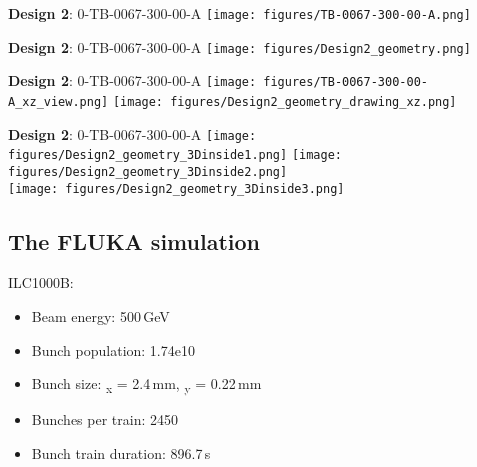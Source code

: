 \documentclass[xcolor={dvipsnames}]{beamer}
\begin{document}
\begin{frame}{\textbf{Design 2}: 0-TB-0067-300-00-A}
\centering
  \texttt{[image: figures/TB-0067-300-00-A.png]}
\end{frame}
\begin{frame}{\textbf{Design 2}: 0-TB-0067-300-00-A}
\centering
  \texttt{[image: figures/Design2\_geometry.png]}
\end{frame}
\begin{frame}{\textbf{Design 2}: 0-TB-0067-300-00-A}
\centering
  \texttt{[image: figures/TB-0067-300-00-A\_xz\_view.png]}
  \hfill
  \texttt{[image: figures/Design2\_geometry\_drawing\_xz.png]}
\end{frame}
\begin{frame}{\textbf{Design 2}: 0-TB-0067-300-00-A}
\centering
  \texttt{[image: figures/Design2\_geometry\_3Dinside1.png]}
    \texttt{[image: figures/Design2\_geometry\_3Dinside2.png]}\\
      \texttt{[image: figures/Design2\_geometry\_3Dinside3.png]}
\end{frame}



\subsection{The FLUKA simulation}
\begin{frame}
 ILC1000B:
 \begin{itemize}
  \item Beam energy: 500\,GeV
  \item Bunch population: 1.74e10
  \item Bunch size: \textsigma\textsubscript{x} = 2.4\,mm, \textsigma\textsubscript{y} = 0.22\,mm
  \item Bunches per train: 2450
  \item Bunch train duration: 896.7\,\textmu s
 \end{itemize}

\end{frame}
\end{document}
